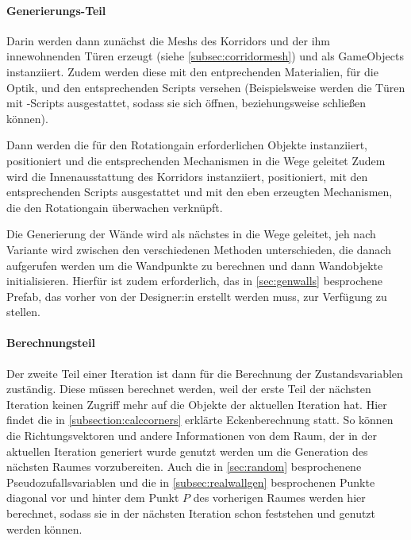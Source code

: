 \paragraph*{Generierungs-Teil}
Darin werden dann zunächst die Meshs des Korridors und der ihm innewohnenden Türen erzeugt (siehe \autoref{subsec:corridormesh}) und als GameObjects instanziiert. Zudem werden diese mit den entprechenden Materialien, für die Optik, und den entsprechenden Scripts versehen (Beispielsweise werden die Türen mit -Scripts ausgestattet, sodass sie sich öffnen, beziehungsweise schließen können).

Dann werden die für den Rotationgain erforderlichen Objekte instanziiert, positioniert und die entsprechenden Mechanismen in die Wege geleitet %
Zudem wird die Innenausstattung des Korridors instanziiert, positioniert, mit den entsprechenden Scripts ausgestattet und mit den eben erzeugten Mechanismen, die den Rotationgain überwachen verknüpft.

Die Generierung der Wände wird als nächstes in die Wege geleitet, jeh nach Variante wird zwischen den verschiedenen Methoden unterschieden, die danach aufgerufen werden um die Wandpunkte zu berechnen und dann Wandobjekte initialisieren. Hierfür ist zudem erforderlich, das in \autoref{sec:genwalls} besprochene Prefab, das vorher von der Designer:in erstellt werden muss, zur Verfügung zu stellen.

\paragraph*{Berechnungsteil}

Der zweite Teil einer Iteration ist dann für die Berechnung der Zustandsvariablen zuständig. Diese müssen berechnet werden, weil der erste Teil der nächsten Iteration keinen Zugriff mehr auf die Objekte der aktuellen Iteration hat. Hier findet die in \autoref{subsection:calccorners} erklärte Eckenberechnung statt. So können die Richtungsvektoren und andere Informationen von dem Raum, der in der aktuellen Iteration generiert wurde genutzt werden um die Generation des nächsten Raumes vorzubereiten. Auch die in \autoref{sec:random} besprochenene Pseudozufallsvariablen und die in \autoref{subsec:realwallgen} besprochenen Punkte diagonal vor und hinter dem Punkt $P$ des vorherigen Raumes werden hier berechnet, sodass sie in der nächsten Iteration schon feststehen und genutzt werden können.


